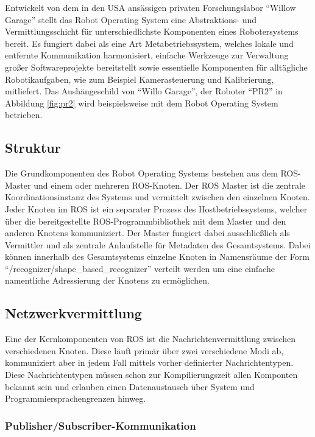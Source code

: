 Entwickelt von dem in den USA ansässigen privaten Forschungslabor "`Willow Garage"' stellt das Robot Operating System eine Abstraktions- und Vermittlungsschicht für unterschiedlichste Komponenten eines Robotersystems bereit.
Es fungiert dabei als eine Art Metabetriebssystem, welches lokale und entfernte Kommunikation harmonisiert, einfache Werkzeuge zur Verwaltung großer Softwareprojekte bereitstellt sowie essentielle Komponenten für alltägliche Robotikaufgaben, wie zum Beispiel Kamerasteuerung und Kalibrierung, mitliefert.
Das Aushängeschild von "`Willo Garage"', der Roboter "`PR2"' in Abbildung \vref{fig:pr2} wird beispielsweise mit dem Robot Operating System betrieben.

\subsection{Struktur}
Die Grundkomponenten des Robot Operating Systems bestehen aus dem ROS-Master und einem oder mehreren ROS-Knoten.
Der ROS Master ist die zentrale Koordinationsinstanz des Systems und vermittelt zwischen den einzelnen Knoten.
Jeder Knoten im ROS ist ein separater Prozess des Hostbetriebssystems, welcher über die bereitgestellte ROS-Programmbibliothek mit dem Master und den anderen Knotens kommuniziert.
Der Master fungiert dabei ausschließlich als Vermittler und als zentrale Anlaufstelle für Metadaten des Gesamtsystems.
Dabei können innerhalb des Gesamtsystems einzelne Knoten in Namensräume der Form "`/recognizer/shape\_based\_recognizer"' verteilt werden um eine einfache namentliche Adressierung der Knotens zu ermöglichen.

\subsection{Netzwerkvermittlung}

Eine der Kernkomponenten von ROS ist die Nachrichtenvermittlung zwischen verschiedenen Knoten.
Diese läuft primär über zwei verschiedene Modi ab, kommuniziert aber in jedem Fall mittels vorher definierter Nachrichtentypen.
Diese Nachrichtentypen müssen schon zur Kompilierungszeit allen Komponten bekannt sein und erlauben einen Datenaustausch über System und Programmiersprachengrenzen hinweg.

\subsubsection{Publisher/Subscriber-Kommunikation}

